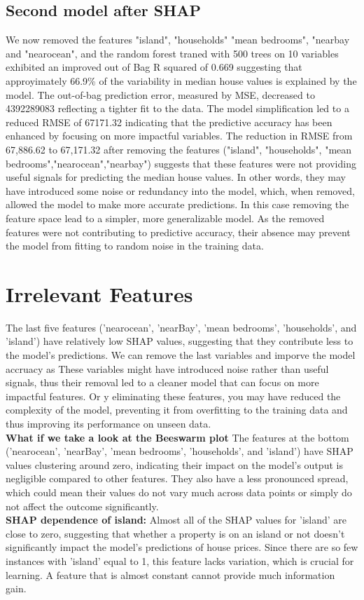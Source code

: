 \documentclass[12pt]{article}
\begin{document}
\subsection{Second model after SHAP}
We now removed the features "island", "households" "mean bedrooms", "nearbay and "nearocean", and the random forest traned with 500 trees on 10 variables exhibited an improved out of Bag R squared of 0.669 suggesting that approyimately  66.9\% of the variability in median house values is explained by the model. The out-of-bag prediction error, measured by MSE, decreased to 4392289083 reflecting a tighter fit to the data. The model simplification led to a reduced RMSE of 67171.32 indicating that the predictive accuracy has been enhanced by focusing on more impactful variables. The reduction in RMSE from  67,886.62  to  67,171.32 after removing the features ("island", "households", "mean bedrooms","nearocean","nearbay") suggests that these features were not providing useful signals for predicting the median house values. In other words, they may have introduced some noise or redundancy into the model, which, when removed, allowed the model to make more accurate predictions. In this case removing the feature space lead to a simpler, more generalizable model. As the removed features were not contributing to predictive accuracy, their absence may prevent the model from fitting to random noise in the training data.

\section{Irrelevant Features}
The last five features ('nearocean', 'nearBay', 'mean bedrooms', 'households', and 'island') have relatively low SHAP values, suggesting that they contribute less to the model's predictions.
We can remove the last variables and imporve the model accruacy as These variables might have introduced noise rather than useful signals, thus their removal led to a cleaner model that can focus on more impactful features. Or y eliminating these features, you may have reduced the complexity of the model, preventing it from overfitting to the training data and thus improving its performance on unseen data.\\
\textbf{What if we take a look at the Beeswarm plot}
The features at the bottom ('nearocean', 'nearBay', 'mean bedrooms', 'households', and 'island') have SHAP values clustering around zero, indicating their impact on the model's output is negligible compared to other features. They also have a less pronounced spread, which could mean their values do not vary much across data points or simply do not affect the outcome significantly.\\
\textbf{SHAP dependence of island:} Almost all of the SHAP values for 'island' are close to zero, suggesting that whether a property is on an island or not doesn’t significantly impact the model's predictions of house prices.
 Since there are so few instances with 'island' equal to 1, this feature lacks variation, which is crucial for learning. A feature that is almost constant cannot provide much information gain.
\end{document}
